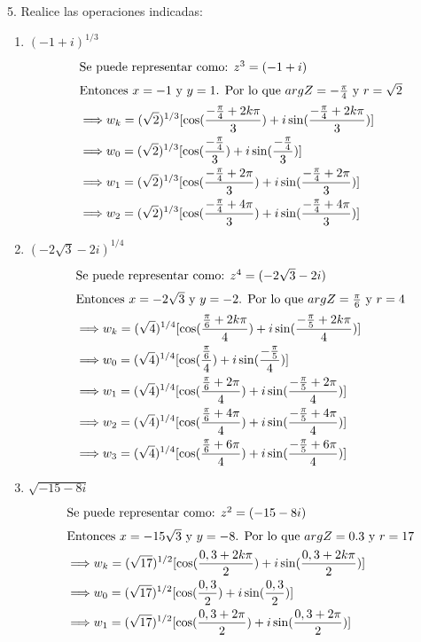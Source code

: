 \documentclass[a4paper,12pt]{article}
\begin{document}
5. Realice las operaciones indicadas:

\begin{enumerate}
    \item $(-1+i)^{1 / 3}$
    \begin{align}
        \intertext{Se puede representar como: $z^3= (-1+i)$}
        \intertext{Entonces $x=-1$ y $y=1$. Por lo que $argZ=-\frac{\pi}{4}$ y $r=\sqrt{2}$}
        \implies& w_k =(\sqrt{2})^{1/3}[\cos(\frac{-\frac{\pi}{4}+2k\pi}{3})+i\sin(\frac{-\frac{\pi}{4}+2k\pi}{3})]\\
        \implies& w_0 =(\sqrt{2})^{1/3}[\cos(\frac{-\frac{\pi}{4}}{3})+i\sin(\frac{-\frac{\pi}{4}}{3})]\\
        \implies& w_1 =(\sqrt{2})^{1/3}[\cos(\frac{-\frac{\pi}{4}+2\pi}{3})+i\sin(\frac{-\frac{\pi}{4}+2\pi}{3})]\\
        \implies& w_2 =(\sqrt{2})^{1/3}[\cos(\frac{-\frac{\pi}{4}+4\pi}{3})+i\sin(\frac{-\frac{\pi}{4}+4\pi}{3})]
    \end{align}
    \item  $(-2 \sqrt{3}-2 i)^{1 / 4}$
    \begin{align}
        \intertext{Se puede representar como: $z^4= (-2\sqrt{3}-2i)$}
        \intertext{Entonces $x=-2\sqrt{3}$ y $y=-2$. Por lo que $argZ=\frac{\pi}{6}$ y $r=4$}
         \implies& w_k =(\sqrt{4})^{1/4}[\cos(\frac{\frac{\pi}{6}+2k\pi}{4})+i\sin(\frac{-\frac{\pi}{5}+2k\pi}{4})]\\
         \implies& w_0 =(\sqrt{4})^{1/4}[\cos(\frac{\frac{\pi}{6}}{4})+i\sin(\frac{-\frac{\pi}{5}}{4})]\\
         \implies& w_1
         =(\sqrt{4})^{1/4}[\cos(\frac{\frac{\pi}{6}+2\pi}{4})+i\sin(\frac{-\frac{\pi}{5}+2\pi}{4})]\\
         \implies& w_2
         =(\sqrt{4})^{1/4}[\cos(\frac{\frac{\pi}{6}+4\pi}{4})+i\sin(\frac{-\frac{\pi}{5}+4\pi}{4})]\\
         \implies& w_3 =(\sqrt{4})^{1/4}[\cos(\frac{\frac{\pi}{6}+6\pi}{4})+i\sin(\frac{-\frac{\pi}{5}+6\pi}{4})]
    \end{align}
    \item  $\sqrt{-15-8 i}$
    \begin{align}
        \intertext{Se puede representar como: $z^2= (-15-8i)$}
        \intertext{Entonces $x=-15\sqrt{3}$ y $y=-8$. Por lo que $argZ=0.3$ y $r=17$}
         \implies& w_k =(\sqrt{17})^{1/2}[\cos(\frac{0,3+2k\pi}{2})+i\sin(\frac{0,3+2k\pi}{2})]\\
         \implies& w_0 =(\sqrt{17})^{1/2}[\cos(\frac{0,3}{2})+i\sin(\frac{0,3}{2})]\\
         \implies& w_1 =(\sqrt{17})^{1/2}[\cos(\frac{0,3+2\pi}{2})+i\sin(\frac{0,3+2\pi}{2})]\\
    \end{align}
\end{enumerate}
\end{document}
